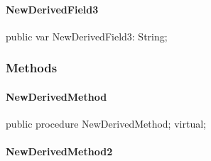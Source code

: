 \documentclass{report}
\begin{document}
\paragraph*{NewDerivedField3}\hspace*{\fill}

\begin{list}{}{
\setlength{\itemindent}{0cm}
\setlength{\listparindent}{0cm}
\setlength{\leftmargin}{\evensidemargin}
\addtolength{\leftmargin}{\tmplength}
\settowidth{\labelsep}{X}
\addtolength{\leftmargin}{\labelsep}
\setlength{\labelwidth}{\tmplength}
}
\begin{flushleft}
\item[\textbf{Declaration}\hfill]
\begin{ttfamily}
public var NewDerivedField3: String;\end{ttfamily}


\end{flushleft}
\end{list}
\subsubsection*{\large{\textbf{Methods}}\normalsize\hspace{1ex}\hfill}
\paragraph*{NewDerivedMethod}\hspace*{\fill}

\begin{list}{}{
\setlength{\itemindent}{0cm}
\setlength{\listparindent}{0cm}
\setlength{\leftmargin}{\evensidemargin}
\addtolength{\leftmargin}{\tmplength}
\settowidth{\labelsep}{X}
\addtolength{\leftmargin}{\labelsep}
\setlength{\labelwidth}{\tmplength}
}
\begin{flushleft}
\item[\textbf{Declaration}\hfill]
\begin{ttfamily}
public procedure NewDerivedMethod; virtual;\end{ttfamily}


\end{flushleft}
\end{list}
\paragraph*{NewDerivedMethod2}\hspace*{\fill}
\end{document}
